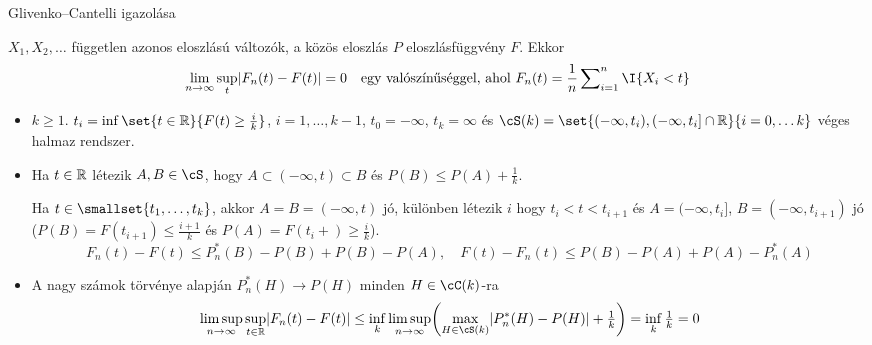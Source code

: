 \documentclass[aspectratio=169,notheorems,9pt,\option]{beamer}
\begin{document}
\begin{frame}{Glivenko--Cantelli igazolása}
  \begin{theorem}
    $X_1,X_2,\dots$ független azonos eloszlású változók, a közös
    eloszlás $P$ eloszlásfüggvény $F$.
    Ekkor
    \begin{displaymath}
      \lim_{n\to\infty}\sup_t \abs*{F_n (t)-F (t)}=0\quad
      \text{egy valószínűséggel, ahol $F_n(t)=\frac1n\sum\nolimits_{i=1}^n \I{X_i<t}$}
    \end{displaymath}
  \end{theorem}
  \begin{itemize}
    \item $k\geq 1$.  $t_i=\inf\set{t\in\real}{F(t)\geq \frac ik}$, $i=1,\dots,k-1$, $t_0=-\infty$, $t_k=\infty$ és
    $\cS(k)=\set{(-\infty,t_i),(-\infty,t_i]\cap\real}{i=0,\dots k}$ véges halmaz rendszer.
    
    \item Ha $t\in\mathbb{R}$ létezik $A,B\in \cS$, hogy $A\subset(-\infty,t)\subset B$ 
    és %
    $P(B)\leq P(A)+\frac1k$. 
    
    Ha $t\in \smallset{t_1,\dots,t_k}$, akkor $A=B=(-\infty,t)$ jó, különben létezik $i$ hogy $t_i<t<t_{i+1}$ és 
    $A=(-\infty,t_i]$, $B=(-\infty,t_{i+1})$ jó ($P(B)=F(t_{i+1})\leq \frac{i+1}k$ és $P(A)=F(t_i+)\geq \frac ik$).
    \continue
    \begin{displaymath}
      F_n(t)-F(t)\leq P_n^*(B)-P(B)+P(B)-P(A),\quad F(t)-F_n(t)\leq P(B)-P(A)+P(A)-P^*_n(A)
    \end{displaymath}
    \pause
    \item A nagy számok törvénye alapján $P_n^*(H)\to P(H)$ minden $H\in\cC(k)$-ra
    \begin{displaymath}
      \limsup_{n\to\infty} \sup_{t\in\real}\abs{F_n(t)-F(t)}
      \leq \inf_k\limsup_{n\to\infty}\zjel*{\max_{H\in \cS(k)}\abs{P_n^*(H)-P(H)}+\tfrac1k}=\inf_k \tfrac1k=0
    \end{displaymath}
  \end{itemize}  
\end{frame}
\end{document}
